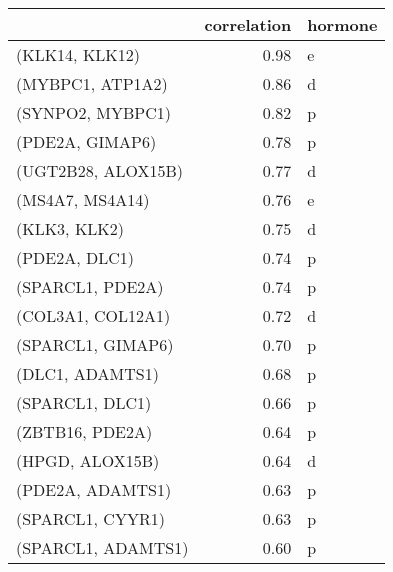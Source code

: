 \begin{tabular}{lrl}
\toprule
{} &  correlation & hormone \\
\midrule
(KLK14, KLK12)     &         0.98 &       e \\
(MYBPC1, ATP1A2)   &         0.86 &       d \\
(SYNPO2, MYBPC1)   &         0.82 &       p \\
(PDE2A, GIMAP6)    &         0.78 &       p \\
(UGT2B28, ALOX15B) &         0.77 &       d \\
(MS4A7, MS4A14)    &         0.76 &       e \\
(KLK3, KLK2)       &         0.75 &       d \\
(PDE2A, DLC1)      &         0.74 &       p \\
(SPARCL1, PDE2A)   &         0.74 &       p \\
(COL3A1, COL12A1)  &         0.72 &       d \\
(SPARCL1, GIMAP6)  &         0.70 &       p \\
(DLC1, ADAMTS1)    &         0.68 &       p \\
(SPARCL1, DLC1)    &         0.66 &       p \\
(ZBTB16, PDE2A)    &         0.64 &       p \\
(HPGD, ALOX15B)    &         0.64 &       d \\
(PDE2A, ADAMTS1)   &         0.63 &       p \\
(SPARCL1, CYYR1)   &         0.63 &       p \\
(SPARCL1, ADAMTS1) &         0.60 &       p \\
\bottomrule
\end{tabular}
